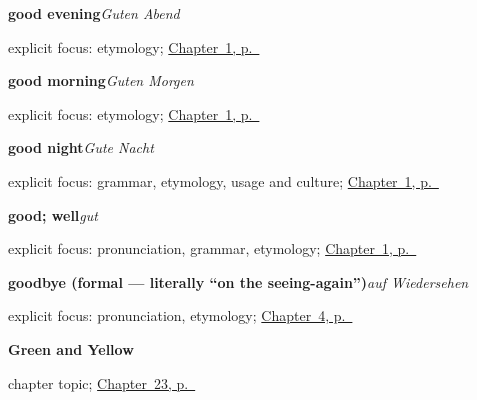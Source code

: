 \noindent\begin{minipage}[t]{\linewidth}
\raggedright
\textbf{good evening}\enspace\emph{Guten Abend}\par
\footnotesize explicit focus: etymology; \hyperref[ch:greetings]{Chapter~1, p.~\pageref*{ch:greetings}}
\end{minipage}\par\smallskip

\noindent\begin{minipage}[t]{\linewidth}
\raggedright
\textbf{good morning}\enspace\emph{Guten Morgen}\par
\footnotesize explicit focus: etymology; \hyperref[ch:greetings]{Chapter~1, p.~\pageref*{ch:greetings}}
\end{minipage}\par\smallskip

\noindent\begin{minipage}[t]{\linewidth}
\raggedright
\textbf{good night}\enspace\emph{Gute Nacht}\par
\footnotesize explicit focus: grammar, etymology, usage and culture; \hyperref[ch:greetings]{Chapter~1, p.~\pageref*{ch:greetings}}
\end{minipage}\par\smallskip

\noindent\begin{minipage}[t]{\linewidth}
\raggedright
\textbf{good; well}\enspace\emph{gut}\par
\footnotesize explicit focus: pronunciation, grammar, etymology; \hyperref[ch:greetings]{Chapter~1, p.~\pageref*{ch:greetings}}
\end{minipage}\par\smallskip

\noindent\begin{minipage}[t]{\linewidth}
\raggedright
\textbf{goodbye (formal — literally \textquotedblleft{}on the seeing-again\textquotedblright{})}\enspace\emph{auf Wiedersehen}\par
\footnotesize explicit focus: pronunciation, etymology; \hyperref[ch:farewells]{Chapter~4, p.~\pageref*{ch:farewells}}
\end{minipage}\par\smallskip

\noindent\begin{minipage}[t]{\linewidth}
\raggedright
\textbf{Green and Yellow}\par
\footnotesize chapter topic; \hyperref[ch:ge-green-and-yellow]{Chapter~23, p.~\pageref*{ch:ge-green-and-yellow}}
\end{minipage}\par\smallskip

